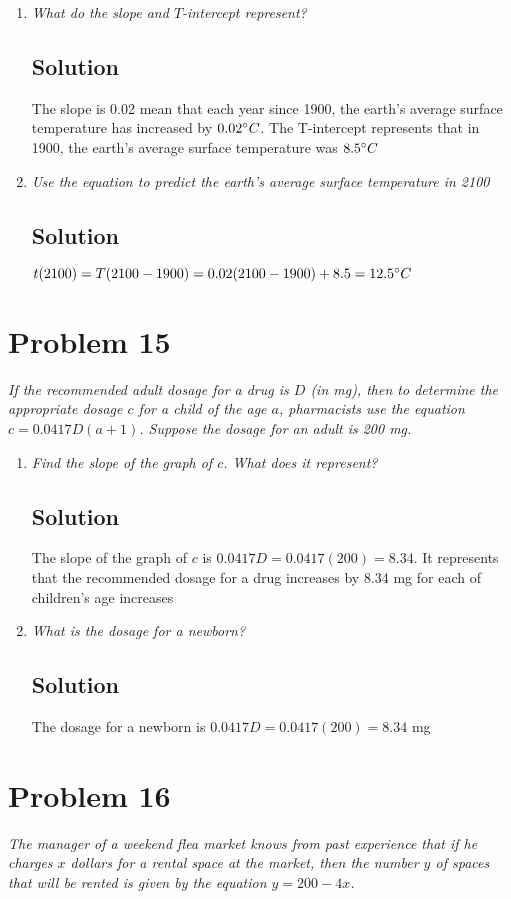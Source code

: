 \documentclass[11pt]{article}
\newcommand{\soln}{\subsection*}
\newcommand{\qn}{\textit}
\begin{document}
\begin{enumerate}
	\item \qn{What do the slope and $T$-intercept represent?}
	\soln{Solution}
	The slope is 0.02 mean that each year since 1900, the earth's average surface temperature has increased by $0.02 \degree C$. The T-intercept represents that in 1900, the earth's average surface temperature was $8.5 \degree C$
	
	\item \qn{Use the equation to predict the earth's average surface temperature in 2100}
	\soln{Solution}
	$t(2100)=T(2100-1900)=0.02(2100-1900)+8.5=12.5 \degree C$
\end{enumerate}

\section*{Problem 15}

\qn{If the recommended adult dosage for a drug is $D$ (in mg), then to determine the appropriate dosage $c$ for a child of the age $a$, pharmacists use the equation $c=0.0417D(a+1)$. Suppose the dosage for an adult is 200 mg.}

\begin{enumerate}
	\item \qn{Find the slope of the graph of $c$. What does it represent?}
	\soln{Solution}
	The slope of the graph of $c$ is $0.0417D=0.0417(200)=8.34$. It represents that the recommended dosage for a drug increases by 8.34 mg for each of children's age increases
	
	\item \qn{What is the dosage for a newborn?}
	\soln{Solution}
	The dosage for a newborn is $0.0417D=0.0417(200)=8.34$ mg
\end{enumerate}

\section*{Problem 16}

\qn{The manager of a weekend flea market knows from past experience that if he charges $x$ dollars for a rental space at the market, then the number $y$ of spaces that will be rented is given by the equation $y=200-4x$.}
\end{document}
